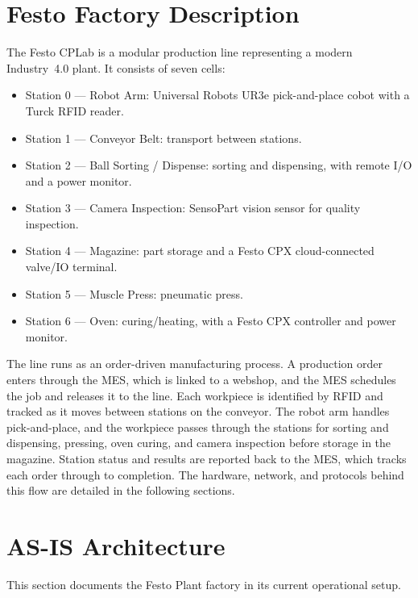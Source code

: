\documentclass[11pt,a4paper]{article}
\begin{document}
\section{Festo Factory Description}
The Festo CPLab is a modular production line representing a
modern Industry~4.0 plant. It consists of seven cells:
\vspace{0.5em}
\begin{itemize}[nosep]
  \item Station 0 --- Robot Arm: Universal Robots UR3e pick-and-place cobot with a Turck RFID reader.
  \item Station 1 --- Conveyor Belt: transport between stations.
  \item Station 2 --- Ball Sorting / Dispense: sorting and dispensing, with remote I/O and a power monitor.
  \item Station 3 --- Camera Inspection: SensoPart vision sensor for quality inspection.
  \item Station 4 --- Magazine: part storage and a Festo CPX cloud-connected valve/IO terminal.
  \item Station 5 --- Muscle Press: pneumatic press.
  \item Station 6 --- Oven: curing/heating, with a Festo CPX controller and power monitor.
\end{itemize}

\vspace{0.5em}
The line runs as an order-driven manufacturing process. A production order
enters through the MES, which is linked to a webshop, and the MES schedules the
job and releases it to the line. Each workpiece is identified by RFID and
tracked as it moves between stations on the conveyor. The robot arm handles
pick-and-place, and the workpiece passes through the stations for sorting and
dispensing, pressing, oven curing, and camera inspection before storage in the
magazine. Station status and results are reported back to the MES, which tracks
each order through to completion. The hardware, network, and protocols behind
this flow are detailed in the following sections.

\section{AS-IS Architecture}
This section documents the Festo Plant factory in its current operational
setup. \\

\end{document}
